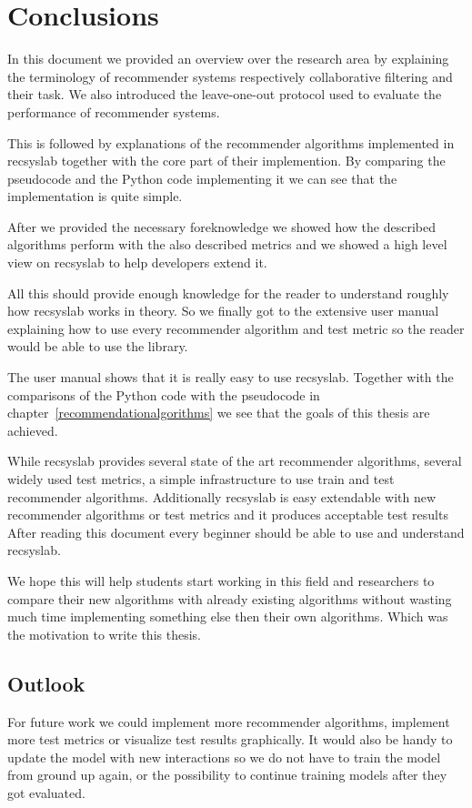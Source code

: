 
\chapter{Conclusions}
In this document we provided an overview over the research area by
explaining the terminology of recommender systems respectively
collaborative filtering and their task. We also introduced the leave-one-out
protocol used to evaluate the performance of recommender systems.

This is followed by explanations of the recommender algorithms implemented in recsyslab
together with the core part of their implemention. By comparing the pseudocode
and the Python code implementing it we can see that the implementation is quite
simple.

After we provided the necessary foreknowledge we showed how the described algorithms
perform with the also described metrics and we showed a high level view on 
recsyslab to help developers extend it.

All this should provide enough knowledge for
the reader to understand roughly how recsyslab works in theory.
So we finally got to the extensive user manual 
explaining how to use every recommender algorithm and test metric so the reader
would be able to use the library.

The user manual shows that it is really easy to use recsyslab.
Together with the comparisons of the Python code with the pseudocode
in chapter~\ref{recommendationalgorithms} we see that the goals of
this thesis are achieved.

While recsyslab provides several state of the art recommender algorithms,
several widely used test metrics, a simple infrastructure to use train and test
recommender algorithms. Additionally recsyslab is easy extendable with new 
recommender algorithms or test metrics and it produces acceptable test results
After reading this document every beginner should be able to use and understand recsyslab.

We hope this will help students start working in this field and researchers to compare their new algorithms
with already existing algorithms without wasting much time implementing something else
then their own algorithms. Which was the motivation to write this thesis.


\section{Outlook}
For future work we could implement more recommender algorithms,
implement more test metrics or visualize test results graphically.
It would also be handy to update the model with new interactions so 
we do not have to train the model from ground up again, or the 
possibility to continue training models after they got evaluated.

